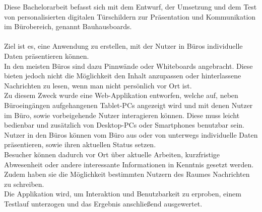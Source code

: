 Diese Bachelorarbeit befasst sich mit dem Entwurf, der Umsetzung und dem Test von personalisierten
digitalen Türschildern zur Präsentation und Kommunikation im Bürobereich, genannt
Bauhausboards.\\\\
Ziel ist es, eine Anwendung zu erstellen, mit der Nutzer in Büros individuelle Daten präsentieren können.\\
In den meisten Büros sind dazu Pinnwände oder Whiteboards angebracht. Diese bieten jedoch nicht die Möglichkeit den Inhalt anzupassen oder hinterlassene Nachrichten zu lesen, wenn man nicht persönlich vor Ort ist.\\
Zu diesem Zweck wurde eine Web-Applikation entworfen, welche auf, neben Büroeingängen aufgehangenen Tablet-PCs angezeigt wird und mit denen Nutzer im Büro, sowie vorbeigehende Nutzer interagieren können.
Diese muss leicht bedienbar und zusätzlich von Desktop-PCs oder Smartphones benutzbar sein.\\
Nutzer in den Büros können vom Büro aus oder von unterwegs individuelle Daten präsentieren, sowie ihren aktuellen Status setzen.\\
Besucher können dadurch vor Ort über aktuelle Arbeiten, kurzfristige Abwesenheit oder andere interessante Informationen in Kenntnis gesetzt werden. Zudem haben sie die Möglichkeit bestimmten Nutzern des Raumes Nachrichten zu schreiben.\\
Die Applikation wird, um Interaktion und Benutzbarkeit zu erproben, einem Testlauf unterzogen und das Ergebnis anschließend ausgewertet.